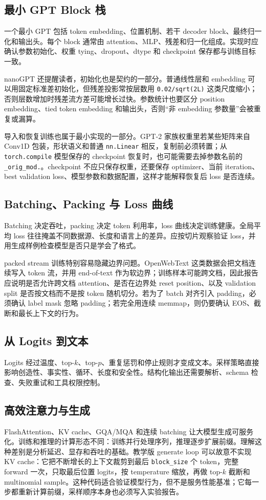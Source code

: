 \documentclass[UTF8,zihao=-4,openany]{ctexbook}
\begin{document}
\subsection{最小 GPT Block 栈}
一个最小 GPT 包括 token embedding、位置机制、若干 decoder block、最终归一化和输出头。每个 block 通常由 attention、MLP、残差和归一化组成。实现时应确认参数初始化、权重 tying、dropout、dtype 和 checkpoint 保存都与训练目标一致。

nanoGPT 还提醒读者，初始化也是契约的一部分。普通线性层和 embedding 可以用固定标准差初始化，但残差投影常按层数用 \texttt{0.02/sqrt(2L)} 这类尺度缩小；否则层数增加时残差流方差可能增长过快。参数统计也要区分 position embedding、tied token embedding 和输出头，否则“非 embedding 参数量”会被重复或漏算。

导入和恢复训练也属于最小实现的一部分。GPT-2 家族权重里若某些矩阵来自 Conv1D 包装，形状语义和普通 \texttt{nn.Linear} 相反，复制前必须转置；从 \texttt{torch.compile} 模型保存的 checkpoint 恢复时，也可能需要去掉参数名前的 \texttt{\_orig\_mod.}。checkpoint 不应只保存权重，还要保存 optimizer、当前 iteration、best validation loss、模型参数和数据配置，这样才能解释恢复后 loss 是否连续。

\subsection{Batching、Packing 与 Loss 曲线}
Batching 决定吞吐，packing 决定 token 利用率，loss 曲线决定训练健康。全局平均 loss 往往掩盖不同数据源、长度和语言上的差异。应按切片观察验证 loss，并用生成样例检查模型是否只是学会了格式。

packed stream 训练特别容易隐藏边界问题。OpenWebText 这类数据会把文档连续写入 token 流，并用 end-of-text 作为软边界；训练样本可能跨文档，因此报告应说明是否允许跨文档 attention、是否在边界处 reset position、以及 validation split 是否按文档而不是按 token 随机切分。若为了 batch 对齐引入 padding，必须确认 label mask 忽略 padding；若完全用连续 memmap，则仍要确认 EOS、截断和最长上下文的行为。

\subsection{从 Logits 到文本}
Logits 经过温度、top-$k$、top-$p$、重复惩罚和停止规则才变成文本。采样策略直接影响创造性、事实性、循环、长度和安全性。结构化输出还需要解析、schema 检查、失败重试和工具权限控制。

\subsection{高效注意力与生成}
FlashAttention、KV cache、GQA/MQA 和连续 batching 让大模型生成可服务化。训练和推理的计算形态不同：训练并行处理序列，推理逐步扩展前缀。理解这种差别是分析延迟、显存和吞吐的基础。教学版 generate loop 可以故意不实现 KV cache：它把不断增长的上下文裁剪到最后 \texttt{block\_size} 个 token，完整 forward 一次，只取最后位置 logits，按 temperature 缩放，再做 top-$k$ 截断和 multinomial sample。这种代码适合验证模型行为，但不是服务性能基准；它每一步都重新计算前缀，采样顺序本身也必须写入实验报告。
\end{document}
